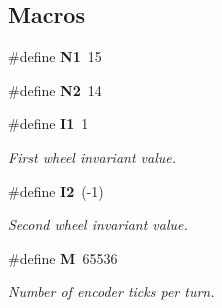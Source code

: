 \subsection*{Macros}
\begin{DoxyCompactItemize}
\item 
\mbox{\label{utils_8c_abd7b39be02bc15d79b73e5cf2b531299}} 
\#define {\bfseries N1}~15
\item 
\mbox{\label{utils_8c_acd864640121c7df2c19f61f7baa507e4}} 
\#define {\bfseries N2}~14
\item 
\mbox{\label{utils_8c_ae7dee1f3e548d0fefe0f67c994de03e4}} 
\#define \textbf{ I1}~1
\begin{DoxyCompactList}\small\item\em First wheel invariant value. \end{DoxyCompactList}\item 
\mbox{\label{utils_8c_a964f933e75944a909cc698a3997c8f14}} 
\#define \textbf{ I2}~(-\/1)
\begin{DoxyCompactList}\small\item\em Second wheel invariant value. \end{DoxyCompactList}\item 
\mbox{\label{utils_8c_a52037c938e3c1b126c6277da5ca689d0}} 
\#define \textbf{ M}~65536
\begin{DoxyCompactList}\small\item\em Number of encoder ticks per turn. \end{DoxyCompactList}\end{DoxyCompactItemize}
